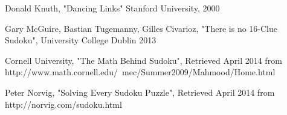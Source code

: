 
\begin{thebibliography}{1}

Donald Knuth, "Dancing Links" Stanford University, 2000

Gary McGuire, Bastian Tugemanny, Gilles Civarioz, "There is no 16-Clue Sudoku", University College Dublin 2013

Cornell University, "The Math Behind Sudoku", Retrieved April 2014 from http://www.math.cornell.edu/~mec/Summer2009/Mahmood/Home.html

Peter Norvig, "Solving Every Sudoku Puzzle", Retrieved April 2014 from http://norvig.com/sudoku.html

\end{thebibliography}
